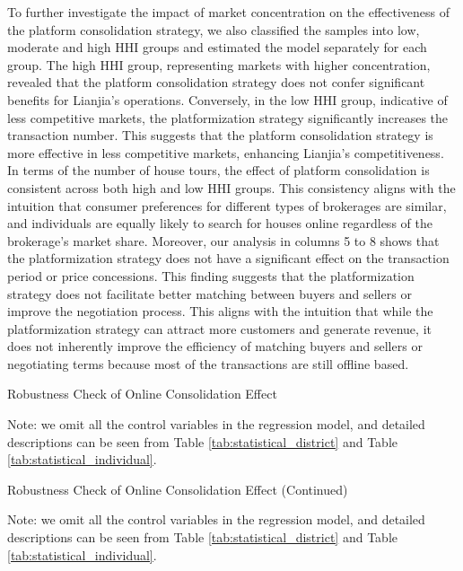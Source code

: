 \documentclass[11pt]{article}
\begin{document}
To further investigate the impact of market concentration on the effectiveness of the platform consolidation strategy, we also classified the samples into low, moderate and high HHI groups and estimated the model separately for each group. The high HHI group, representing markets with higher concentration, revealed that the platform consolidation strategy does not confer significant benefits for Lianjia's operations. Conversely, in the low HHI group, indicative of less competitive markets, the platformization strategy significantly increases the transaction number. This suggests that the platform consolidation strategy is more effective in less competitive markets, enhancing Lianjia's competitiveness. In terms of the number of house tours, the effect of platform consolidation is consistent across both high and low HHI groups. This consistency aligns with the intuition that consumer preferences for different types of brokerages are similar, and individuals are equally likely to search for houses online regardless of the brokerage's market share. Moreover, our analysis in columns 5 to 8 shows that the platformization strategy does not have a significant effect on the transaction period or price concessions. This finding suggests that the platformization strategy does not facilitate better matching between buyers and sellers or improve the negotiation process. This aligns with the intuition that while the platformization strategy can attract more customers and generate revenue, it does not inherently improve the efficiency of matching buyers and sellers or negotiating terms because most of the transactions are still offline based.

\begin{table}
  \begin{center}
    \begin{scriptsize}
      \caption{Robustness Check of Online Consolidation Effect}
      \label{tab:heter_platform_did_1}
      
    
    Note: we omit all the control variables in the regression model, and detailed descriptions can be seen from Table \ref{tab:statistical_district} and Table \ref{tab:statistical_individual}.
    \end{scriptsize}
  \end{center}
\end{table}

\begin{table}
  \begin{center}
    \begin{scriptsize}
      \caption{Robustness Check of Online Consolidation Effect (Continued)}
      \label{tab:heter_platform_did_2}
      
    
    Note: we omit all the control variables in the regression model, and detailed descriptions can be seen from Table \ref{tab:statistical_district} and Table \ref{tab:statistical_individual}.
    \end{scriptsize}
  \end{center}
\end{table}
\end{document}
